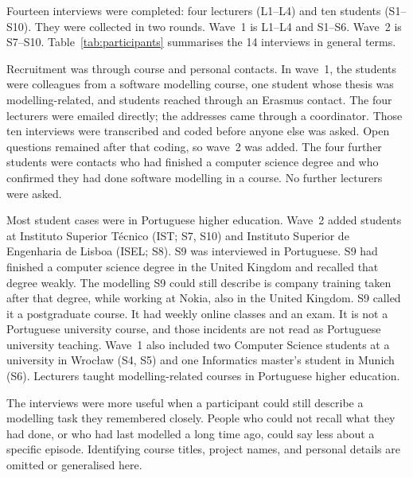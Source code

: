Fourteen interviews were completed: four lecturers (L1--L4) and ten students (S1--S10). They were collected in two rounds. Wave~1 is L1--L4 and S1--S6. Wave~2 is S7--S10. Table~\ref{tab:participants} summarises the 14 interviews in general terms.

Recruitment was through course and personal contacts. In wave~1, the students were colleagues from a software modelling course, one student whose thesis was modelling-related, and students reached through an Erasmus contact. The four lecturers were emailed directly; the addresses came through a coordinator. Those ten interviews were transcribed and coded before anyone else was asked. Open questions remained after that coding, so wave~2 was added. The four further students were contacts who had finished a computer science degree and who confirmed they had done software modelling in a course. No further lecturers were asked.

Most student cases were in Portuguese higher education. Wave~2 added students at Instituto Superior T\'ecnico (IST; S7, S10) and Instituto Superior de Engenharia de Lisboa (ISEL; S8). S9 was interviewed in Portuguese. S9 had finished a computer science degree in the United Kingdom and recalled that degree weakly. The modelling S9 could still describe is company training taken after that degree, while working at Nokia, also in the United Kingdom. S9 called it a postgraduate course. It had weekly online classes and an exam. It is not a Portuguese university course, and those incidents are not read as Portuguese university teaching. Wave~1 also included two Computer Science students at a university in Wroc{\l}aw (S4, S5) and one Informatics master's student in Munich (S6). Lecturers taught modelling-related courses in Portuguese higher education.

The interviews were more useful when a participant could still describe a modelling task they remembered closely. People who could not recall what they had done, or who had last modelled a long time ago, could say less about a specific episode. Identifying course titles, project names, and personal details are omitted or generalised here.

